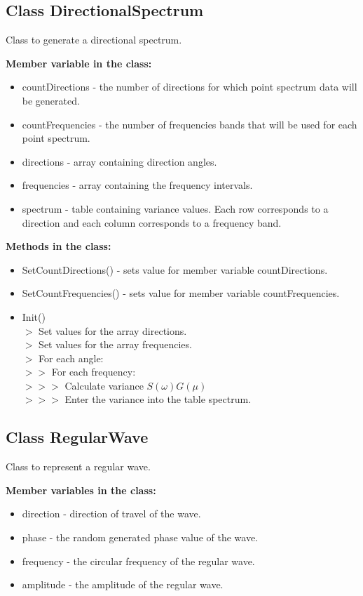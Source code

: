 \subsection{Class DirectionalSpectrum} \label{Class DirectionalSpectrum}
Class to generate a directional spectrum.

\textbf{Member variable in the class:} 
\begin{itemize} 
  \item countDirections - the number of directions for which point spectrum data 
    will be generated.  
  \item countFrequencies - the number of frequencies bands that will be used for 
    each point spectrum.  
  \item directions - array containing direction angles.
  \item frequencies - array containing the frequency intervals.
  \item spectrum - table containing variance values. Each row corresponds to 
    a direction and each column corresponds to a frequency band.  
\end{itemize}

\textbf{Methods in the class:}
\begin{itemize}
	\item SetCountDirections() - sets value for member variable countDirections.
	\item SetCountFrequencies() - sets value for member variable countFrequencies.
	\item Init()\\
    $>$ Set values for the array directions. \\
		$>$ Set values for the array frequencies. \\
		$>$ For each angle:\\
		$>>$ For each frequency:\\
		$>>>$ Calculate variance $S(\omega)G(\mu)$\\
    $>>>$ Enter the variance into the table spectrum. 
\end{itemize}

\subsection{Class RegularWave} \label{Class RegularWave}
Class to represent a regular wave.

\textbf{Member variables in the class:}
\begin{itemize}
	\item direction - direction of travel of the wave.
	\item phase - the random generated phase value of the wave.
	\item frequency - the circular frequency of the regular wave.
	\item amplitude - the amplitude of the regular wave.
\end{itemize}

